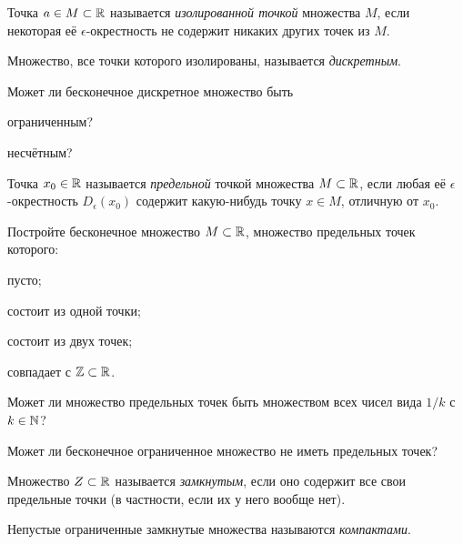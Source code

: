 \documentclass[a4paper, 12pt, num=28]{listok}
\begin{document}
\begin{definition}
	Точка $a \in M \subset \mathbb{R}$ называется \textit{изолированной точкой} множества $M$,
	если некоторая её $\epsilon$-окрестность не содержит никаких других точек из $M$.
\end{definition}
\begin{definition}
	Множество, все точки которого изолированы, называется \textit{дискретным}.
\end{definition}
\begin{problem}
	Может ли бесконечное дискретное множество быть
	\begin{probparts}
		\item ограниченным?
		\item несчётным?
	\end{probparts}
\end{problem}
\begin{definition}
	Точка $x_0 \in \mathbb{R}$ называется \textit{предельной} точкой множества $M \subset \mathbb{R}$,
	если любая её $\epsilon$-окрестность $D_{\epsilon}(x_0)$ содержит какую-нибудь точку $x \in M$, отличную от $x_0$.
\end{definition}
\begin{problem}
	Постройте бесконечное множество $M \subset \mathbb{R}$, множество предельных точек которого:
	\begin{probparts}
		\item пусто;
		\item состоит из одной точки;
		\item состоит из двух точек;
		\item совпадает с $\mathbb{Z} \subset \mathbb{R}$.
	\end{probparts}
\end{problem}
\begin{problem}
	Может ли множество предельных точек быть множеством всех чисел вида $1/k$ с $k\in\mathbb{N}$?
\end{problem}
\begin{problem}
	Может ли бесконечное ограниченное множество не иметь предельных точек?
\end{problem}
\begin{definition}
	Множество $Z \subset \mathbb{R}$ называется \textit{замкнутым}, если оно содержит все свои предельные точки (в частности, если их у него вообще нет).
\end{definition}
\begin{definition}
	Непустые ограниченные замкнутые множества называются \textit{компактами}.
\end{definition}
\end{document}
